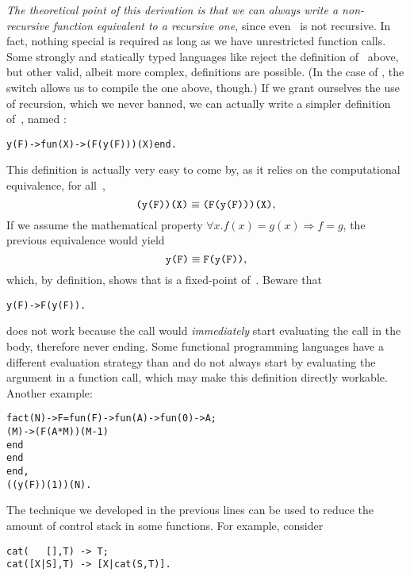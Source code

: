 \emph{The theoretical point of this derivation is that we can always
  write a non\hyp{}recursive function equivalent to a recursive one,}
since even ~is not recursive. In fact, nothing special is
required as long as we have unrestricted function calls. Some strongly
and statically typed languages like \OCaml reject the definition
of~ above, but other valid, albeit more complex,
definitions are possible. (In the case of \OCaml, the switch
 allows us to compile the one above, though.) If we
grant ourselves the use of recursion, which we never banned, we can
actually write a simpler definition of~, named
:
\begin{alltt}
y(F) -> fun(X) -> (F(y(F)))(X) end.\hfill% \emph{Recursive}
\end{alltt}
This definition is actually very easy to come by, as it relies on the
computational equivalence, for all~,
\begin{equation*}
\texttt{(y(F))(X)} \equiv \texttt{(F(y(F)))(X)},
\end{equation*}
If we assume the mathematical property \(\forall x.f(x) = g(x)
\Rightarrow f = g\), the previous equivalence would yield
\begin{equation*}
\texttt{y(F)} \equiv \texttt{F(y(F))},
\end{equation*}
which, by definition, shows that  is a
fixed\hyp{}point of~. Beware that
\begin{alltt}
y(F) -> F(y(F)).\hfill% \emph{Infinite loop}
\end{alltt}
does not work because the call  would
\emph{immediately} start evaluating the call  in the
body, therefore never ending. Some functional programming languages
have a different evaluation strategy than \Erlang and do not always
start by evaluating the argument in a function call, which may make
this definition directly workable. Another example:
\begin{alltt}
fact(N) -> F = fun(F) -> fun(A) -> fun(0) -> A;
                                      (M) -> (F(A*M))(M-1)
                                   end
                         end
               end,
           ((y(F))(1))(N).
\end{alltt}
The technique we developed in the previous lines can be used to reduce
the amount of control stack in some functions. For example, consider
\begin{verbatim}
cat(   [],T) -> T;
cat([X|S],T) -> [X|cat(S,T)].
\end{verbatim}
